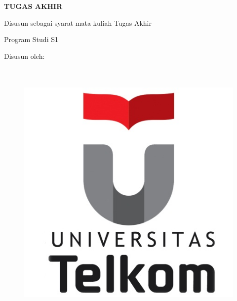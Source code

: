 
\begin{titlepage}
    \begin{center}      
        \bo{\Judul} \\[0.55cm]
        
        \vspace*{1 cm}
        \textit{\bo{\JudulInggris}} \\[1.5cm]

        \vspace*{0.05 cm}    
        \textbf{TUGAS AKHIR}
        
        \vspace*{1 cm}
        
Disusun sebagai syarat mata kuliah Tugas Akhir

Program Studi S1 \program

        \vspace*{1 cm}       
        Disusun oleh:\\
        \bo{\Penulis} \\
        \bo{\nim} \\

        \vspace*{1.0cm}
        
        \begin{figure}
            \begin{center}
                \includegraphics[scale=1]{pics/pengantar/Untel.jpg}
            \end{center}
        \end{figure}
        \vspace*{1.0cm}
    \end{center}
\end{titlepage}
